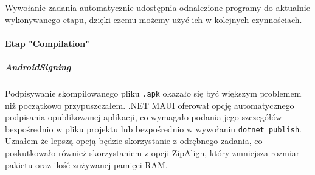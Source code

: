 Wywołanie zadania automatycznie udostępnia odnalezione programy do aktualnie wykonywanego etapu, dzięki czemu 
możemy użyć ich w kolejnych czynnościach.

\paragraph*{Etap "Compilation"}
\subparagraph{AndroidSigning}
Podpisywanie skompilowanego pliku \verb|.apk| okazało się być większym problemem niż początkowo przypuszczałem.
.NET MAUI oferował opcję automatycznego podpisania opublikowanej aplikacji, co wymagało podania jego szczegółów 
bezpośrednio w pliku projektu lub bezpośrednio w wywołaniu \verb|dotnet publish|.
Uznałem że lepszą opcją będzie skorzystanie z odrębnego zadania, co poskutkowało również skorzystaniem z opcji 
ZipAlign, który zmniejsza rozmiar pakietu oraz ilość zużywanej pamięci RAM.